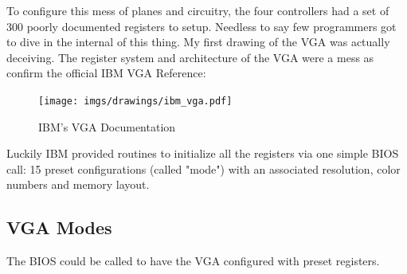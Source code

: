 \documentclass[book.tex]{subfiles}
\begin{document}
 

 

\par
To configure this mess of planes and circuitry, the four controllers had a set of 300 poorly documented registers to setup. Needless to say few programmers got to dive in the internal of this thing. My first drawing of the VGA was actually deceiving. The register system and architecture of the VGA were a mess as confirm the official IBM VGA Reference:\\
 \begin{figure}[H]
\centering
\texttt{[image: imgs/drawings/ibm\_vga.pdf]}
\caption{IBM's VGA Documentation}
\label{fig:ibm_vga}
\end{figure}

\bigskip



Luckily IBM provided routines to initialize all the registers via one simple BIOS call: 15 preset configurations (called "mode") with an associated resolution, color numbers and memory layout.

\subsection{VGA Modes}

The BIOS could be called to have the VGA configured with preset registers.
\end{document}
